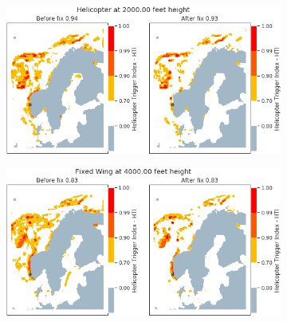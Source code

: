 \begin{figure}[H]
    \begin{subfigure}{0.45\textwidth}
    \includegraphics[width=\textwidth]{Figures/00.png}
    \caption{}
    \label{fig:HTI00}
    \end{subfigure}
\hfill
    \begin{subfigure}{0.45\textwidth}
    \includegraphics[width=\textwidth]{Figures/01.png}
    \caption{}
    \label{fig:HTI01}
    \end{subfigure}


\end{figure}
